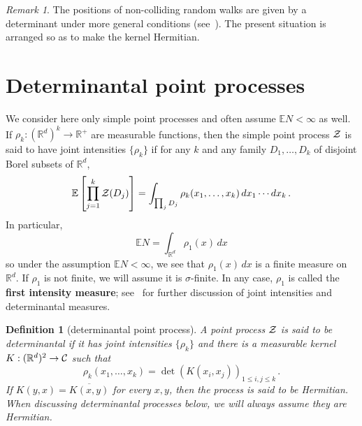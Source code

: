 \documentclass[10pt]{article}
\theoremstyle{plain}
\newtheorem{defn}[thm]{Definition}
\theoremstyle{remark}
\newtheorem*{unremark}{Remark}
\newcommand{\Em}[1]{\textbf{#1}}
\def\R{\mathbb{R}}
\def\CC{{\cal C}}
\def\E{{\mathbb E}}
\def\ZZ{{\cal Z}}
\begin{document}
\begin{unremark}
The positions of non-colliding random walks are given by a determinant
under more general conditions (see~\cite{karlin-mcgregor}).
The present situation is arranged so as
to make the kernel Hermitian.
\end{unremark}

\section{Determinantal point processes}
\label{s:continuous}

We consider here only simple point processes and often assume
$\E N < \infty$ as well.
If $\rho_k : (\R^d)^k \to \R^+$ are measurable functions, then the
simple point process $\ZZ$ is said to have joint intensities
$\{ \rho_k \}$ if for any $k$ and any family $D_1 , \ldots , D_k$
of disjoint Borel subsets of $\R^d$,
$$\E \left [ \prod_{j=1}^k \ZZ (D_j) \right ] = \int_{\prod_j D_j}
   \rho_k (x_1 , \ldots , x_k) \, dx_1 \cdots dx_k \, .$$
In particular,
$$\E N = \int_{\R^d} \rho_1 (x) \, dx$$
so under the assumption $\E N < \infty$, we see that
$\rho_1 (x) \, dx$ is a finite measure on $\R^d$.  If
$\rho_1$ is not finite, we will assume it is $\sigma$-finite.
In any case, $\rho_1$ is called the \Em{first intensity measure};
see~\cite[Sections~1.2~and~4.2]{HKPV} for further discussion of
joint intensities and determinantal measures.

\begin{defn}[determinantal point process]
A point process $\ZZ$ is said to be determinantal if it has
joint intensities $\{ \rho_k \}$ and there is a measurable kernel
$K : (\R^d)^2 \to \CC$ such that
\begin{equation} \label{eq:kernel}
\rho_k (x_1 , \ldots , x_k)
   = \det \left ( K(x_i , x_j) \right )_{1 \leq i,j \leq k} \, .
\end{equation}
If $K(y,x) = \overline{K(x,y)}$ for every $x,y$, then the process
is said to be Hermitian. When discussing determinantal processes below, we will always assume they are Hermitian.
\end{defn}
\end{document}
